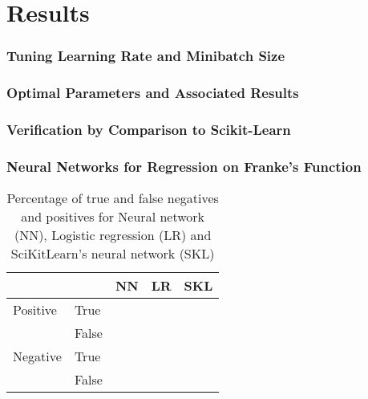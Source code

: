 \section{Results}
\label{sec:results}

\subsubsection{Tuning Learning Rate and Minibatch Size}

\subsubsection*{Optimal Parameters and Associated Results}

\subsubsection{Verification by Comparison to Scikit-Learn}

\subsubsection{Neural Networks for Regression on Franke's Function}


\begin{table}[htbp]
\caption{Percentage of true and false negatives and positives for Neural network (NN), Logistic regression (LR) and SciKitLearn's neural network (SKL)}
	\begin{tabular}{l  l  r  r  r} 
		 & & \textbf{NN} & \textbf{LR} & \textbf{SKL} \\
		 \hline
		Positive & True & & & \\ 
		 & False & & & \\ 
		 \hline
		Negative & True & & & \\ 
		& False &  & & \\
	\end{tabular}
\label{tab:confusion}
\end{table}

\begin{figure}[htbp]
	\centering
	\caption{}
	\label{fig:}
\end{figure}
